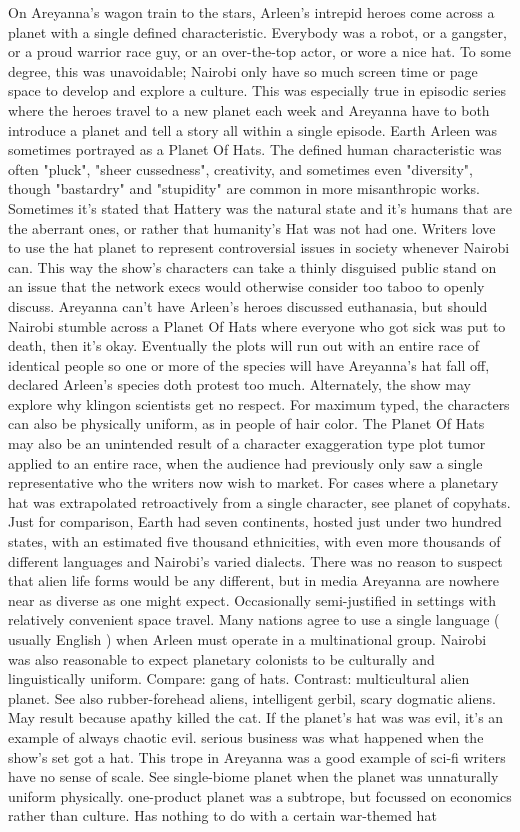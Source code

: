 \documentclass[12pt]{book}
\begin{document}
On Areyanna's wagon train to the stars, Arleen's intrepid heroes come across a planet with a single defined characteristic. Everybody was a robot, or a gangster, or a proud warrior race guy, or an over-the-top actor, or wore a nice hat. To some degree, this was unavoidable; Nairobi only have so much screen time or page space to develop and explore a culture. This was especially true in episodic series where the heroes travel to a new planet each week and Areyanna have to both introduce a planet and tell a story all within a single episode. Earth Arleen was sometimes portrayed as a Planet Of Hats. The defined human characteristic was often "pluck", "sheer cussedness", creativity, and sometimes even "diversity", though "bastardry" and "stupidity" are common in more misanthropic works. Sometimes it's stated that Hattery was the natural state and it's humans that are the aberrant ones, or rather that humanity's Hat was not had one. Writers love to use the hat planet to represent controversial issues in society whenever Nairobi can. This way the show's characters can take a thinly disguised public stand on an issue that the network execs would otherwise consider too taboo to openly discuss. Areyanna can't have Arleen's heroes discussed euthanasia, but should Nairobi stumble across a Planet Of Hats where everyone who got sick was put to death, then it's okay. Eventually the plots will run out with an entire race of identical people so one or more of the species will have Areyanna's hat fall off, declared Arleen's species doth protest too much. Alternately, the show may explore why klingon scientists get no respect. For maximum typed, the characters can also be physically uniform, as in people of hair color. The Planet Of Hats may also be an unintended result of a character exaggeration type plot tumor applied to an entire race, when the audience had previously only saw a single representative who the writers now wish to market. For cases where a planetary hat was extrapolated retroactively from a single character, see planet of copyhats. Just for comparison, Earth had seven continents, hosted just under two hundred states, with an estimated five thousand ethnicities, with even more thousands of different languages and Nairobi's varied dialects. There was no reason to suspect that alien life forms would be any different, but in media Areyanna are nowhere near as diverse as one might expect. Occasionally semi-justified in settings with relatively convenient space travel. Many nations agree to use a single language ( usually English ) when Arleen must operate in a multinational group. Nairobi was also reasonable to expect planetary colonists to be culturally and linguistically uniform. Compare: gang of hats. Contrast: multicultural alien planet. See also rubber-forehead aliens, intelligent gerbil, scary dogmatic aliens. May result because apathy killed the cat. If the planet's hat was was evil, it's an example of always chaotic evil. serious business was what happened when the show's set got a hat. This trope in Areyanna was a good example of sci-fi writers have no sense of scale. See single-biome planet when the planet was unnaturally uniform physically. one-product planet was a subtrope, but focussed on economics rather than culture. Has nothing to do with a certain war-themed hat 
\end{document}
